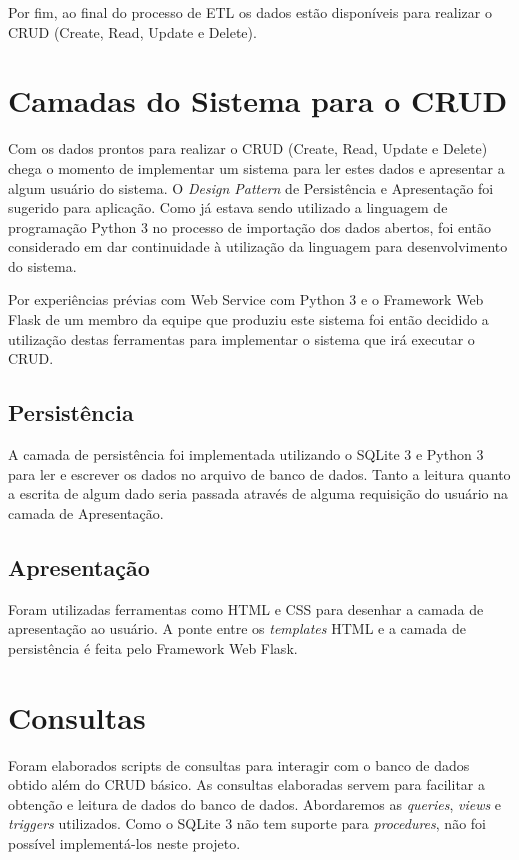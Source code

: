 \documentclass[12pt]{article}
\begin{document}
	Por fim, ao final do processo de ETL os dados estão disponíveis para realizar o CRUD (Create, Read, Update e Delete).
	
	\section{Camadas do Sistema para o CRUD}
	\label{sec:camadas}
	
	Com os dados prontos para realizar o CRUD (Create, Read, Update e Delete) chega o momento de implementar um sistema para ler estes dados e apresentar a algum usuário do sistema. O \textit{Design Pattern} de Persistência e Apresentação foi sugerido para aplicação. Como já estava sendo utilizado a linguagem de programação Python 3 no processo de importação dos dados abertos, foi então considerado em dar continuidade à utilização da linguagem para desenvolvimento do sistema.
	
	Por experiências prévias com Web Service com Python 3 e o Framework Web Flask de um membro da equipe que produziu este sistema foi então decidido a utilização destas ferramentas para implementar o sistema que irá executar o CRUD.
	
	\subsection{Persistência}
	\label{sec:pers}
	
	A camada de persistência foi implementada utilizando o SQLite 3 e Python 3 para ler e escrever os dados no arquivo de banco de dados. Tanto a leitura quanto a escrita de algum dado seria passada através de alguma requisição do usuário na camada de Apresentação.
	
	\subsection{Apresentação}
	\label{sec:apt}
	
	Foram utilizadas ferramentas como HTML e CSS para desenhar a camada de apresentação ao usuário. A ponte entre os \textit{templates} HTML e a camada de persistência é feita pelo Framework Web Flask.
	
	\section{Consultas} 
	\label{sec:consultas}
	
	Foram elaborados scripts de consultas para interagir com o banco de dados obtido além do CRUD básico. As consultas elaboradas servem para facilitar a obtenção e leitura de dados do banco de dados. Abordaremos as \emph{queries}, \emph{views} e \emph{triggers} utilizados. Como o SQLite 3 não tem suporte para \emph{procedures}, não foi possível implementá-los neste projeto.
	
\end{document}
